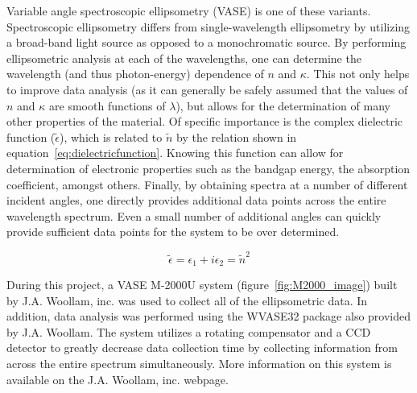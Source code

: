 Variable angle spectroscopic ellipsometry (VASE) is one of these variants. Spectroscopic ellipsometry differs from single-wavelength ellipsometry by utilizing a broad-band light source as opposed to a monochromatic source. By performing ellipsometric analysis at each of the wavelengths, one can determine the wavelength (and thus photon-energy) dependence of $n$ and $\kappa$. This not only helps to improve data analysis (as it can generally be safely assumed that the values of $n$ and $\kappa$ are smooth functions of $\lambda$), but allows for the determination of many other properties of the material. Of specific importance is the complex dielectric function ($\tilde{\epsilon}$), which is related to $\tilde{n}$ by the relation shown in equation~\ref{eq:dielectricfunction}. Knowing this function can allow for determination of electronic properties such as the bandgap energy, the absorption coefficient, amongst others. Finally, by obtaining spectra at a number of different incident angles, one directly provides additional data points across the entire wavelength spectrum. Even a small number of additional angles can quickly provide sufficient data points for the system to be over determined. 

\begin{equation}
 \label{eq:dielectricfunction}
 \displaystyle
	\tilde{\epsilon} = \epsilon_{1} + i\epsilon_{2} = \tilde{n}^{2}
\end{equation}

During this project, a VASE M-2000U system (figure~\ref{fig:M2000_image}) built by J.A. Woollam, inc. was used to collect all of the ellipsometric data. In addition, data analysis was performed using the WVASE32 package also provided by J.A. Woollam. The system utilizes a rotating compensator and a CCD detector to greatly decrease data collection time by collecting information from across the entire spectrum simultaneously.  More information on this system is available on the J.A. Woollam, inc. webpage.\cite{woollam-web}

